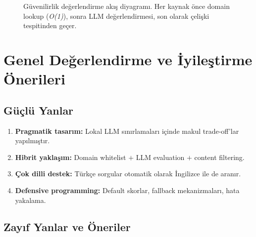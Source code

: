 \begin{figure}[H]
\caption{G\"{u}venilirlik de\u{g}erlendirme ak{\i}\c{s} diyagram{\i}. Her kaynak \"{o}nce domain lookup (\emph{O(1)}), sonra LLM de\u{g}erlendirmesi, son olarak \c{c}eli\c{s}ki tespitinden ge\c{c}er.}
\label{fig:trust-flow}
\end{figure}


\section{Genel De\u{g}erlendirme ve \.{I}yile\c{s}tirme \"{O}nerileri}
\label{sec:guvenilirlik-degerlendirme}

\subsection{G\"{u}\c{c}l\"{u} Yanlar}

\begin{enumerate}
  \item \textbf{Pragmatik tasar{\i}m:} Lokal LLM s{\i}n{\i}rlamalar{\i} i\c{c}inde makul trade-off'lar yap{\i}lm{\i}\c{s}t{\i}r.
  \item \textbf{Hibrit yakla\c{s}{\i}m:} Domain whitelist $+$ LLM evaluation $+$ content filtering.
  \item \textbf{\c{C}ok dilli destek:} T\"{u}rk\c{c}e sorgular otomatik olarak \.{I}ngilizce ile de aran{\i}r.
  \item \textbf{Defensive programming:} Default skorlar, fallback mekanizmalar{\i}, hata yakalama.
\end{enumerate}

\subsection{Zay{\i}f Yanlar ve \"{O}neriler}

